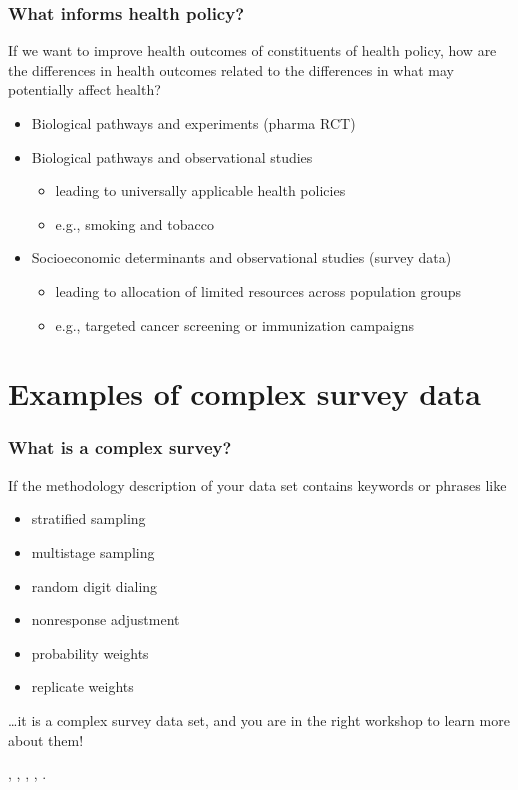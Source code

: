\documentclass{beamer}
\begin{document}
\begin{frame}\frametitle{What informs health policy?}

If we want to improve health outcomes of constituents of health policy,
how are the differences in health outcomes related to
the differences in what may potentially affect health?

\begin{itemize}
    \item Biological pathways and experiments (pharma RCT)
    \item Biological pathways and observational studies
    \begin{itemize}
        \item leading to universally applicable health policies
        \item e.g., smoking and tobacco
    \end{itemize}
    \item Socioeconomic determinants and observational studies (survey data)
    \begin{itemize}
        \item leading to allocation of limited resources across population groups
        \item e.g., targeted cancer screening or immunization campaigns
    \end{itemize}
\end{itemize}

\end{frame}

\section{Examples of complex survey data}

\begin{frame}\frametitle{What is a complex survey?}

If the methodology description of your data set contains keywords or phrases like
\begin{itemize}
    \item stratified sampling
    \item multistage sampling
    \item random digit dialing
    \item nonresponse adjustment
    \item probability weights
    \item replicate weights
\end{itemize}

\ldots it is a complex survey data set, and you are in the right workshop to learn more about them!

\medskip

\citet{korn:graubard:1999}, \citet{heeringa:west:berglund:2017}, \citet{lumley:2010},
\citet{chambers:skinner:2003}, \citet{pfeffermann:rao:2009}.

\end{frame}
\end{document}
